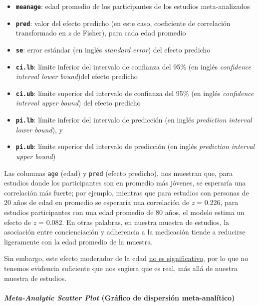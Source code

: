 \documentclass[
  bookmarksnumbered]{article}
\begin{document}
\begin{itemize}
\item
  \textbf{\texttt{meanage}}: edad promedio de los participantes de los estudios meta-analizados
\item
  \textbf{\texttt{pred}}: valor del efecto predicho (en este caso, coeficiente de correlación transformado en \emph{z} de Fisher), para cada edad promedio
\item
  \textbf{\texttt{se}}: error estándar (en inglés \emph{standard error}) del efecto predicho
\item
  \textbf{\texttt{ci.lb}}: límite inferior del intervalo de confianza del 95\% (en inglés \emph{confidence interval lower bound})del efecto predicho
\item
  \textbf{\texttt{ci.ub}}: límite superior del intervalo de confianza del 95\% (en inglés \emph{confidence interval upper bound}) del efecto predicho
\item
  \textbf{\texttt{pi.lb}}: límite inferior del intervalo de predicción (en inglés \emph{prediction interval lower bound}), y
\item
  \textbf{\texttt{pi.ub}}: límite superior del intervalo de predicción (en inglés \emph{prediction interval upper bound})
\end{itemize}

Las columnas \texttt{age} (edad) y \texttt{pred} (efecto predicho), nos muestran que, para estudios donde los participantes son en promedio más jóvenes, se esperaría una correlación más fuerte; por ejemplo, mientras que para estudios con personas de 20 años de edad en promedio se esperaría una correlación de \emph{z} = 0.226, para estudios participantes con una edad promedio de 80 años, el modelo estima un efecto de \emph{z} = 0.082. En otras palabras, en nuestra muestra de estudios, la asociación entre concienciación y adherencia a la medicación tiende a reducirse ligeramente con la edad promedio de la muestra.

Sin embargo, este efecto moderador de la edad \underline{no es significativo}, por lo que no tenemos evidencia suficiente que nos sugiera que es real, más allá de nuestra muestra de estudios.

\hypertarget{meta-analytic-scatter-plot-gruxe1fico-de-dispersiuxf3n-meta-analuxedtico}{%
\paragraph{\texorpdfstring{\emph{Meta-Analytic Scatter Plot} (Gráfico de dispersión meta-analítico)}{Meta-Analytic Scatter Plot (Gráfico de dispersión meta-analítico)}}\label{meta-analytic-scatter-plot-gruxe1fico-de-dispersiuxf3n-meta-analuxedtico}}
\end{document}
